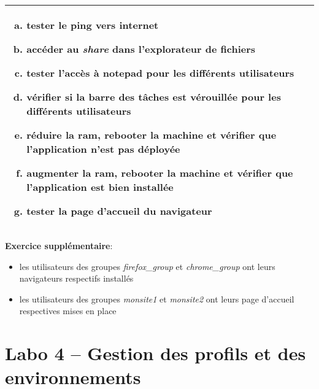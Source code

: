 \documentclass[a4paper]{article}
\begin{document}
\begin{center}
\begin{tabular}{|p{7.5cm}|p{7.5cm}|}
        \multicolumn{2}{|p{15cm}|}{
            \begin{enumerate}[(a)]
                \item tester le ping vers internet
                \item accéder au \textit{share} dans l'explorateur de fichiers
                \item tester l'accès à notepad pour les différents utilisateurs
                \item vérifier si la barre des tâches est vérouillée pour les différents utilisateurs
                \item réduire la ram, rebooter la machine et vérifier que l'application n'est pas déployée
                \item augmenter la ram, rebooter la machine et vérifier que l'application est bien installée
                \item tester la page d'accueil du navigateur
            \end{enumerate}
        }

        \\ \hline

    \end{tabular}
\end{center}

\textbf{Exercice supplémentaire}:
\begin{itemize}
    \item les utilisateurs des groupes \textit{firefox\_group} et \textit{chrome\_group} ont leurs navigateurs respectifs installés
    \item les utilisateurs des groupes \textit{monsite1} et \textit{monsite2} ont leurs page d'accueil respectives mises en place
\end{itemize}















\section{Labo 4 -- Gestion des profils et des environnements}
\end{document}
